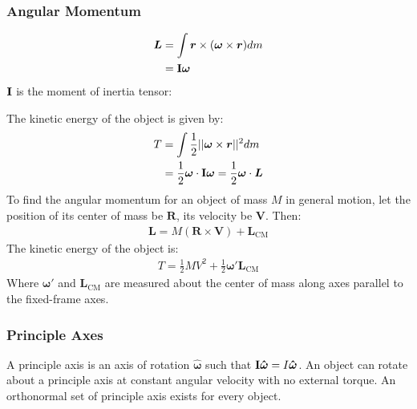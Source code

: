\documentclass[11pt, letterpaper]{article}
\newcommand{\ve}[1]{
  \ensuremath{\bm{#1}}}	               %
\newcommand{\uve}[1]{
  \ensuremath{\bm{\hat{#1}}}}          %
\newcommand{\tensor}[1]{
  \ensuremath{\text{\bf{#1}}}}         %
\begin{document}
\begin{multicols*}{3}
\subsubsection{Angular Momentum}
\begin{align*}
  \ve{L} &= \int \ve{r} \times (\ve{\omega} \times \ve{r}) dm \\
  &= \tensor{I} \ve{\omega}
\end{align*}
$\tensor{I}$ is the moment of inertia tensor:
\vspace*{-0.7em}
\begin{center}
\end{center}
The kinetic energy of the object is given by:
\begin{align*}
  T &= \int\frac{1}{2} ||\ve{\omega} \times \ve{r}||^2 dm \\
  &= \frac{1}{2} \ve{\omega} \cdot \tensor{I}\ve{\omega} = \frac{1}{2} \ve{\omega} \cdot \ve{L}
\end{align*}
To find the angular momentum for an object of mass $M$ in general motion, let
the position of its center of mass be $\ve{R}$, its velocity be $\ve{V}$. Then:
\begin{align*}
  \ve{L} = M(\ve{R} \times \ve{V}) + \ve{L}_{\text{CM}}
\end{align*}
The kinetic energy of the object is:
\begin{align*}
  T = \frac{1}{2}MV^2 + \frac{1}{2}\ve{\omega}' \ve{L}_{\text{CM}}
\end{align*}
Where $\ve{\omega}'$ and $\ve{L}_{\text{CM}}$ are measured about the center of
mass along axes parallel to the fixed-frame axes.
\subsubsection{Principle Axes}
A principle axis is an axis of rotation $\uve{\omega}$ such that
$\tensor{I}\uve{\omega} = I\uve{\omega}$. An object can rotate about a principle
axis at constant angular velocity with no external torque. An orthonormal set of
principle axis exists for every object.

\end{multicols*}
\end{document}
